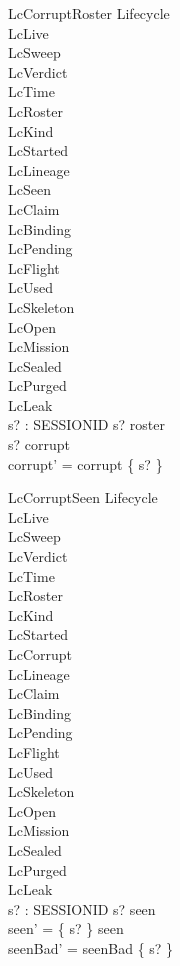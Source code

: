 \documentclass[a4paper,10pt,fleqn]{article}
\begin{document}
\begin{schema}{LcCorruptRoster}
\Delta Lifecycle \\
\Xi LcLive \\
\Xi LcSweep \\
\Xi LcVerdict \\
\Xi LcTime \\
\Xi LcRoster \\
\Xi LcKind \\
\Xi LcStarted \\
\Xi LcLineage \\
\Xi LcSeen \\
\Xi LcClaim \\
\Xi LcBinding \\
\Xi LcPending \\
\Xi LcFlight \\
\Xi LcUsed \\
\Xi LcSkeleton \\
\Xi LcOpen \\
\Xi LcMission \\
\Xi LcSealed \\
\Xi LcPurged \\
\Xi LcLeak \\
s? : SESSIONID
\where
s? \in roster \\
s? \notin corrupt \\
corrupt' = corrupt \cup \{ s? \}
\end{schema}

\begin{schema}{LcCorruptSeen}
\Delta Lifecycle \\
\Xi LcLive \\
\Xi LcSweep \\
\Xi LcVerdict \\
\Xi LcTime \\
\Xi LcRoster \\
\Xi LcKind \\
\Xi LcStarted \\
\Xi LcCorrupt \\
\Xi LcLineage \\
\Xi LcClaim \\
\Xi LcBinding \\
\Xi LcPending \\
\Xi LcFlight \\
\Xi LcUsed \\
\Xi LcSkeleton \\
\Xi LcOpen \\
\Xi LcMission \\
\Xi LcSealed \\
\Xi LcPurged \\
\Xi LcLeak \\
s? : SESSIONID
\where
s? \in \dom seen \\
seen' = \{ s? \} \ndres seen \\
seenBad' = seenBad \cup \{ s? \}
\end{schema}
\end{document}
